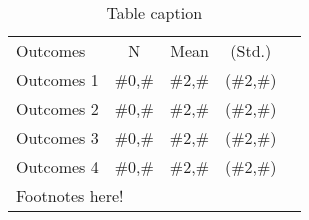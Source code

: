 \documentclass{article}
\begin{document}
\begin{table}
    \caption{Table caption}
    \label{tab:example_matrix}
    \begin{tabular}{
            p{4.25cm}@{\hskip 6pt}c
            @{\hskip 15pt}
            r@{\hskip 3pt}c
            @{\hskip 15pt}
        c}
        Outcomes
        & N
        & Mean
        & (Std.)
        \\
        Outcomes 1 & \#0,\# & \#2,\# & (\#2,\#) \\
        Outcomes 2 & \#0,\# & \#2,\# & (\#2,\#) \\
        Outcomes 3 & \#0,\# & \#2,\# & (\#2,\#) \\
        Outcomes 4 & \#0,\# & \#2,\# & (\#2,\#) \\
        \multicolumn{4}{p{5cm}}{\footnotesize Footnotes here!}
    \end{tabular}
\end{table}
\end{document}
